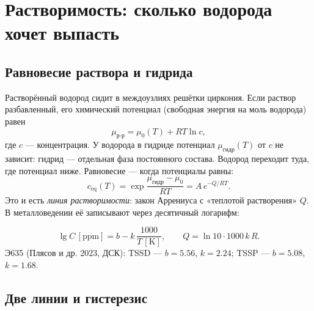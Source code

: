 \chapter{Растворимость: сколько водорода хочет выпасть}\label{ch:solubility}

\section{Равновесие раствора и гидрида}

Растворённый водород сидит в междоузлиях решётки циркония. Если раствор разбавленный, его
химический потенциал (свободная энергия на моль водорода) равен
\begin{equation}
\mu_{\text{р-р}}=\mu_0(T)+RT\ln c ,
\end{equation}
где $c$ --- концентрация. У водорода в гидриде потенциал $\mu_{\text{гидр}}(T)$ от $c$ не зависит:
гидрид --- отдельная фаза постоянного состава. Водород переходит туда, где потенциал ниже.
Равновесие --- когда потенциалы равны:
\begin{equation}
c_{\text{eq}}(T)=\exp\frac{\mu_{\text{гидр}}-\mu_0}{RT}=A\,e^{-Q/RT}.
\end{equation}
Это и есть \emph{линия растворимости}: закон Аррениуса с «теплотой растворения» $Q$. В
металловедении её записывают через десятичный логарифм:

\begin{keyf}
\[
\lg C\,[\text{ppm}]=b-k\,\frac{1000}{T\,[\text{K}]},\qquad Q=\ln10\cdot1000\,k\,R .
\]
Э635 (Плясов и др. 2023, ДСК): TSSD --- $b=5.56$, $k=2.24$; TSSP --- $b=5.08$, $k=1.68$.
\end{keyf}

\section{Две линии и гистерезис}


